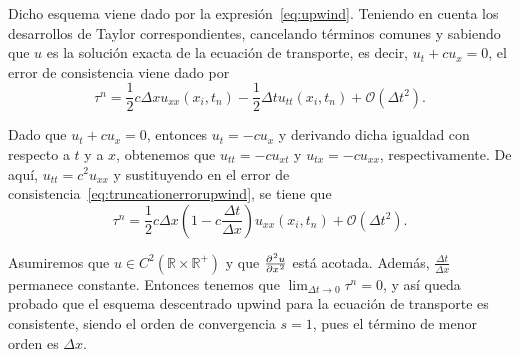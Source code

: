 \begin{frame}
    \frametitle{\secname}

    \begin{example}
        Dicho esquema viene dado por la expresión~\eqref{eq:upwind}.
        Teniendo en cuenta los desarrollos de Taylor correspondientes,
        cancelando términos comunes y sabiendo que $u$ es la solución
        exacta de la ecuación de transporte, es decir,
        $u_{t}+cu_{x}=0$, el error de consistencia viene dado por
        \begin{equation}\label{eq:truncationerrorupwind}
            \tau^{n}=
            \frac{1}{2}
            c\Delta x
            u_{xx}
            \left(x_{i},t_{n}\right)-
            \frac{1}{2}\Delta t
            u_{tt}
            \left(x_{i},t_{n}\right)+
            \mathcal{O}
            \left(\Delta t^{2}\right).
        \end{equation}

        Dado que $u_{t}+cu_{x}=0$, entonces $u_{t}=-cu_{x}$ y derivando
        dicha igualdad con respecto a $t$ y a $x$, obtenemos que
        $u_{tt}=-cu_{xt}$ y $u_{tx}=-cu_{xx}$, respectivamente.
        De aquí, $u_{tt}=c^{2}u_{xx}$ y sustituyendo en el error de
        consistencia~\eqref{eq:truncationerrorupwind}, se tiene que
        \begin{equation*}
            \tau^{n}=
            \frac{1}{2}
            c\Delta x
            \left(
            1-c\frac{\Delta t}{\Delta x}
            \right)
            u_{xx}
            \left(x_{i},t_{n}\right)+
            \mathcal{O}
            \left(\Delta t^{2}\right).
        \end{equation*}

        Asumiremos que
        \begin{math}
            u\in
            C^{2}
            \left(
            \mathbb{R}\times
            \mathbb{R}^{+}
            \right)
        \end{math}
        y que $\diffp[2]{u}{x}$ está acotada.
        Además, $\frac{\Delta t}{\Delta x}$ permanece constante.
        Entonces tenemos que $\lim_{\Delta t\to0}\tau^{n}=0$, y así queda
        probado que el esquema descentrado upwind para la
        ecuación de transporte es consistente, siendo el orden de
        convergencia $s=1$, pues el término de menor orden es $\Delta x$.
    \end{example}
\end{frame}

